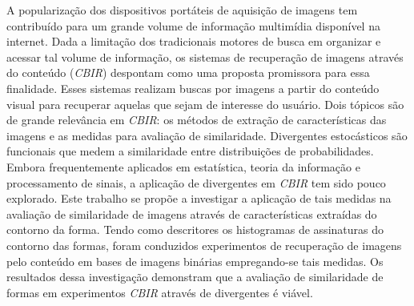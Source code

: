 A popularização dos dispositivos portáteis de aquisição de imagens tem contribuído para um grande volume de informação multimídia disponível na internet. Dada a limitação dos tradicionais motores de busca em organizar e acessar tal volume de informação, os sistemas de recuperação de imagens através do conteúdo (\emph{CBIR}) despontam como uma proposta promissora para essa finalidade. Esses sistemas realizam buscas por imagens a partir do conteúdo visual para recuperar aquelas que sejam de interesse do usuário. Dois tópicos são de grande relevância em \emph{CBIR}: os métodos de extração de características das imagens e as medidas para avaliação de similaridade. Divergentes estocásticos são funcionais que medem a similaridade entre distribuições de probabilidades. Embora frequentemente aplicados em estatística, teoria da informação e processamento de sinais, a aplicação de divergentes em \emph{CBIR} tem sido pouco explorado. Este trabalho se propõe a investigar a aplicação de tais medidas na avaliação de similaridade de imagens através de características extraídas do contorno da forma. Tendo como descritores os histogramas de assinaturas do contorno das formas, foram conduzidos experimentos de recuperação de imagens pelo conteúdo em bases de imagens binárias empregando-se tais medidas. Os resultados dessa investigação demonstram que a avaliação de similaridade de formas em experimentos \emph{CBIR} através de divergentes é viável.         

